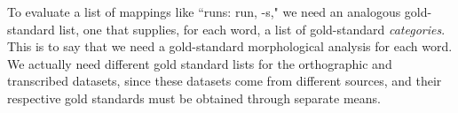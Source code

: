 To evaluate a list of mappings like ``runs: run, -s," we need an analogous 
gold-standard list, one that supplies, for each word, a list of gold-standard \emph{categories}.
This is to say that we need a gold-standard morphological analysis for each word. 
We actually need different gold standard lists for the orthographic and transcribed datasets, 
since these datasets come from different sources, and their respective gold standards must 
be obtained through separate means.


 


